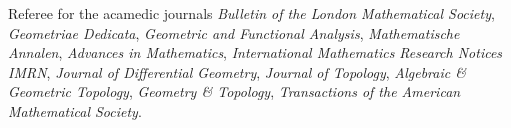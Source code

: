 

Referee for the acamedic journals \textit{Bulletin of the London Mathematical Society}, \textit{Geometriae Dedicata}, \textit{Geometric and Functional Analysis}, \textit{Mathematische Annalen}, \textit{Advances in Mathematics}, \textit{International Mathematics Research Notices IMRN}, \textit{Journal of Differential Geometry}, \textit{Journal of Topology}, \textit{Algebraic \& Geometric Topology}, \textit{Geometry \& Topology}, \textit{Transactions of the American Mathematical Society}.

%

